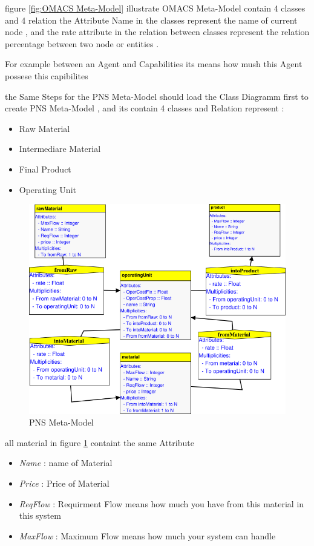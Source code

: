 figure \ref{fig:OMACS Meta-Model} illustrate OMACS Meta-Model  contain 4 classes 
and 4 relation   
the Attribute Name in the classes represent the name of current node ,
and the rate attribute in the relation between classes represent  the relation percentage between two node or entities  .

For example between an Agent and Capabilities its means how mush this Agent possese this capibilites
 

the Same Steps for the PNS Meta-Model should load the Class Diagramm first to create PNS Meta-Model , and its contain 4 classes and Relation
represent  : 
\begin{itemize}
	\item Raw Material  
	\item Intermediare Material
	\item Final Product
	\item Operating Unit
\end{itemize}

\begin{figure}[th] 

	\centering
 	\includegraphics[scale=0.7]{Chapiter3/img/pns_meta}
	\caption{\label{fig:PNS Meta-Model}PNS Meta-Model}
	
\end{figure} 

all material in figure \ref{fig:PNS Meta-Model} containt the same Attribute
\begin{itemize}


\item \textit{Name} : name of Material 
\item \textit{Price} : Price of Material
\item \textit{ReqFlow} : Requirment Flow means how much you have from this material in this system
\item \textit{MaxFlow} : Maximum Flow means how much your system can handle

\end{itemize}



